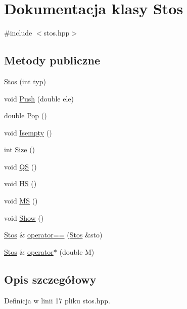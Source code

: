 \hypertarget{class_stos}{\section{Dokumentacja klasy Stos}
\label{class_stos}
}


{\ttfamily \#include $<$stos.\-hpp$>$}

\subsection*{Metody publiczne}
\begin{DoxyCompactItemize}
\item 
\hyperlink{class_stos_a9f1a0e5eb781e7296493d9c61f6ce2e2}{Stos} (int typ)
\item 
void \hyperlink{class_stos_af8c0c485dceb28e986cdc93e933ec365}{Push} (double ele)
\item 
double \hyperlink{class_stos_a620d6e49f74becaed97de2a911ef051c}{Pop} ()
\item 
void \hyperlink{class_stos_a8e559abb36abb64c458bdc281e273cba}{Isempty} ()
\item 
int \hyperlink{class_stos_a9861291fa460528db0dea0262bf88f69}{Size} ()
\item 
void \hyperlink{class_stos_a94b800e273d51af77ae4fcf88b3134e4}{Q\-S} ()
\item 
void \hyperlink{class_stos_a0e531afe4371783988c3ba470c04f5df}{H\-S} ()
\item 
void \hyperlink{class_stos_a16e80bfd5b01cc6febec3a94269daea5}{M\-S} ()
\item 
void \hyperlink{class_stos_abfb03d80298013a2792bde2fd89c3863}{Show} ()
\item 
\hyperlink{class_stos}{Stos} \& \hyperlink{class_stos_a46c03bf71cc3b8abc5537a5a408c43e8}{operator==} (\hyperlink{class_stos}{Stos} \&sto)
\item 
\hyperlink{class_stos}{Stos} \& \hyperlink{class_stos_a1a82883d837c3c63c3621e284c707304}{operator$\ast$} (double M)
\end{DoxyCompactItemize}


\subsection{Opis szczegółowy}


Definicja w linii 17 pliku stos.\-hpp.



